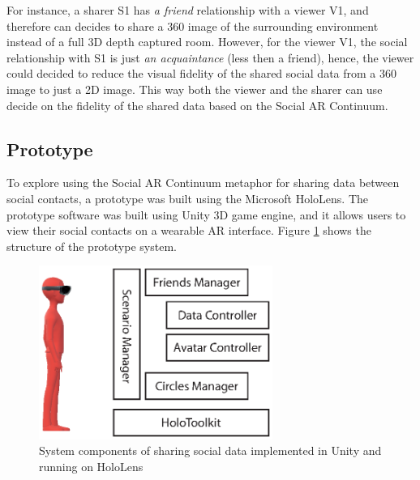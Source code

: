 
For instance, a sharer S1 has \textit{a friend} relationship with a viewer V1, and therefore can decides to share a 360 image of the surrounding environment instead of a full 3D depth captured room. However, for the viewer V1, the social relationship with S1 is just \textit{an acquaintance} (less then a friend), hence, the viewer could decided to reduce the visual fidelity of the shared social data from a 360 image to just a 2D image. This way both the viewer and the sharer can use decide on the fidelity of the shared data based on the Social AR Continuum.  


\subsection{Prototype}

To explore using the Social AR Continuum metaphor for sharing data between social contacts, a prototype was built using the Microsoft HoloLens. The prototype software was built using Unity 3D game engine, and it allows users to view their social contacts on a wearable AR interface. Figure \ref{fig:data:system} shows the structure of the prototype system. 

\begin{figure}[ht]
    \centering
    \includegraphics[width=3in]{images/chi/images-03.eps}
    \caption{System components of sharing social data implemented in Unity and running on HoloLens}
    \label{fig:data:system}
\end{figure}

